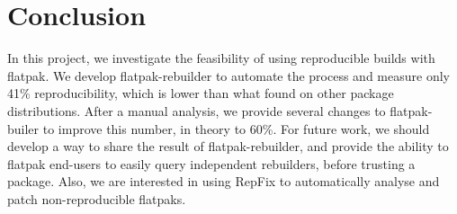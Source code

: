 \documentclass[a4paper,11pt,oneside]{report}
\theoremstyle{definition}
\newcommand{\sysname}{flatpak-rebuilder\xspace}
\newcommand{\rb}{reproducible builds\xspace}
\newcommand{\fp}{flatpak\xspace}
\newcommand{\fb}{flatpak-builer\xspace}
\begin{document}
\chapter{Conclusion}

In this project, we investigate the feasibility of using \rb with \fp. We
develop \sysname to automate the process and measure only 41\% reproducibility,
which is lower than what found on other package distributions. After a manual
analysis, we provide several changes to \fb to improve this number, in theory
to 60\%. For future work, we should develop a way to share the result of
\sysname, and provide the ability to \fp end-users to easily query independent
rebuilders, before trusting a package. Also, we are interested in using RepFix
to automatically analyse and patch non-reproducible flatpaks.

\cleardoublepage
{}
{}
\printbibliography
\end{document}
